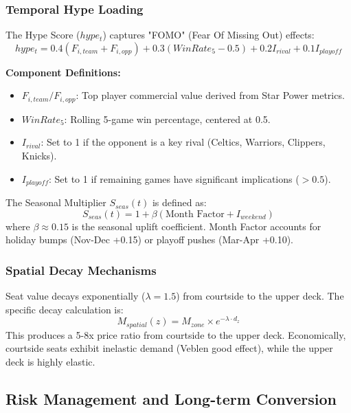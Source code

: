 \documentclass[12pt]{article}
\begin{document}
\subsubsection{Temporal Hype Loading}
The Hype Score ($hype_t$) captures "FOMO" (Fear Of Missing Out) effects:
\begin{equation}
hype_t = 0.4(F_{i,team} + F_{i,opp}) + 0.3(WinRate_5 - 0.5) + 0.2 I_{rival} + 0.1 I_{playoff}
\end{equation}

\textbf{Component Definitions:}
\begin{itemize}
    \item $F_{i,team}/F_{i,opp}$: Top player commercial value derived from Star Power metrics.
    \item $WinRate_5$: Rolling 5-game win percentage, centered at 0.5.
    \item $I_{rival}$: Set to 1 if the opponent is a key rival (Celtics, Warriors, Clippers, Knicks).
    \item $I_{playoff}$: Set to 1 if remaining games have significant implications ($>0.5$).
\end{itemize}

The Seasonal Multiplier $S_{seas}(t)$ is defined as:
\begin{equation}
S_{seas}(t) = 1 + \beta (\text{Month Factor} + I_{weekend})
\end{equation}
where $\beta \approx 0.15$ is the seasonal uplift coefficient. Month Factor accounts for holiday bumps (Nov-Dec +0.15) or playoff pushes (Mar-Apr +0.10).

\subsubsection{Spatial Decay Mechanisms}
Seat value decays exponentially ($\lambda=1.5$) from courtside to the upper deck. The specific decay calculation is:
\begin{equation}
M_{spatial}(z) = M_{zone} \times e^{-\lambda \cdot d_z}
\end{equation}
This produces a 5-8x price ratio from courtside to the upper deck. Economically, courtside seats exhibit inelastic demand (Veblen good effect), while the upper deck is highly elastic.

\subsection{Risk Management and Long-term Conversion}
\end{document}
